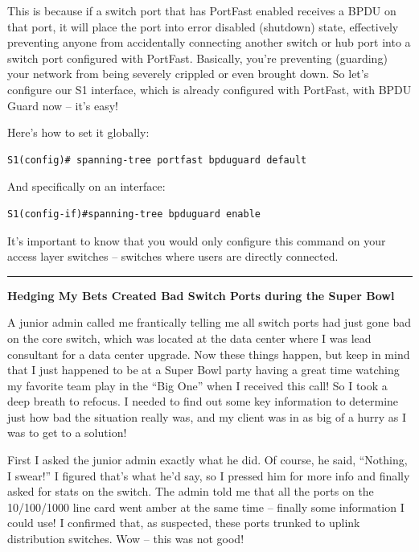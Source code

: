 \documentclass[b5paper,11pt]{memoir}
\begin{document}
This is because if a switch port that has PortFast enabled receives a
BPDU on that port, it will place the port into error disabled (shutdown)
state, effectively preventing anyone from accidentally connecting
another switch or hub port into a switch port configured with PortFast.
Basically, you're preventing (guarding) your network from being severely
crippled or even brought down. So let's configure our S1 interface,
which is already configured with PortFast, with BPDU Guard now -- it's
easy!

Here's how to set it globally:

\begin{verbatim}
S1(config)# spanning-tree portfast bpduguard default
\end{verbatim}

And specifically on an interface:

\begin{verbatim}
S1(config-if)#spanning-tree bpduguard enable
\end{verbatim}

It's important to know that you would only configure this command on
your access layer switches -- switches where users are directly
connected.

\begin{center}\rule{0.5\linewidth}{0.5pt}\end{center}

\textbf{Hedging My Bets Created Bad Switch Ports during the Super Bowl}

A junior admin called me frantically telling me all switch ports had
just gone bad on the core switch, which was located at the data center
where I was lead consultant for a data center upgrade. Now these things
happen, but keep in mind that I just happened to be at a Super Bowl
party having a great time watching my favorite team play in the ``Big
One'' when I received this call! So I took a deep breath to refocus. I
needed to find out some key information to determine just how bad the
situation really was, and my client was in as big of a hurry as I was to
get to a solution!

First I asked the junior admin exactly what he did. Of course, he said,
``Nothing, I swear!'' I figured that's what he'd say, so I pressed him
for more info and finally asked for stats on the switch. The admin told
me that all the ports on the 10/100/1000 line card went amber at the
same time -- finally some information I could use! I confirmed that, as
suspected, these ports trunked to uplink distribution switches.
Wow -- this was not good!
\end{document}

